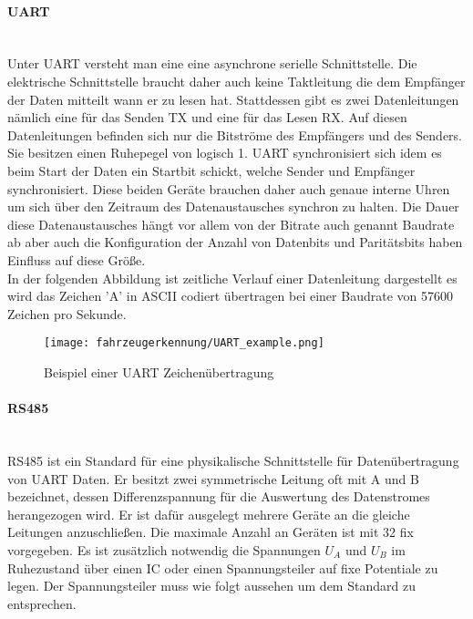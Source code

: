 \paragraph{UART}\mbox{}\\

Unter UART versteht man eine eine asynchrone serielle Schnittstelle. Die elektrische Schnittstelle braucht daher auch keine Taktleitung die dem Empfänger der Daten mitteilt wann er zu lesen hat. Stattdessen gibt es zwei Datenleitungen nämlich eine 
für das Senden TX und eine für das Lesen RX. Auf diesen Datenleitungen befinden sich nur die Bitströme des Empfängers und des Senders. Sie besitzen einen Ruhepegel von logisch 1.
UART synchronisiert sich idem es beim Start der Daten ein Startbit schickt, welche Sender und Empfänger synchronisiert. 
Diese beiden Geräte brauchen daher auch genaue interne Uhren um sich über den Zeitraum des Datenaustausches synchron zu halten.
Die Dauer diese Datenaustausches hängt vor allem von der Bitrate auch genannt Baudrate ab aber auch die Konfiguration der Anzahl von Datenbits und Paritätsbits haben Einfluss auf diese Größe. 
\\
In der folgenden Abbildung ist zeitliche Verlauf einer Datenleitung dargestellt es wird das Zeichen 'A' in ASCII codiert übertragen bei einer Baudrate von 57600 Zeichen pro Sekunde.

\begin{figure}[H]
    \centering
    \texttt{[image: fahrzeugerkennung/UART\_example.png]}
    \caption{Beispiel einer UART Zeichenübertragung}
\end{figure}

\paragraph{RS485}\mbox{}\\

RS485 ist ein Standard für eine physikalische Schnittstelle für Datenübertragung von UART Daten. Er besitzt zwei symmetrische Leitung oft mit A und B bezeichnet, dessen Differenzspannung für die Auswertung
des Datenstromes herangezogen wird. Er ist dafür ausgelegt mehrere Geräte an die gleiche Leitungen anzuschließen. Die maximale Anzahl an Geräten ist mit 32 fix vorgegeben. Es ist zusätzlich notwendig die Spannungen 
$U_{A}$ und $U_{B}$ im Ruhezustand über einen IC oder einen Spannungsteiler auf fixe Potentiale zu legen. Der Spannungsteiler muss wie folgt aussehen um dem Standard zu entsprechen.

